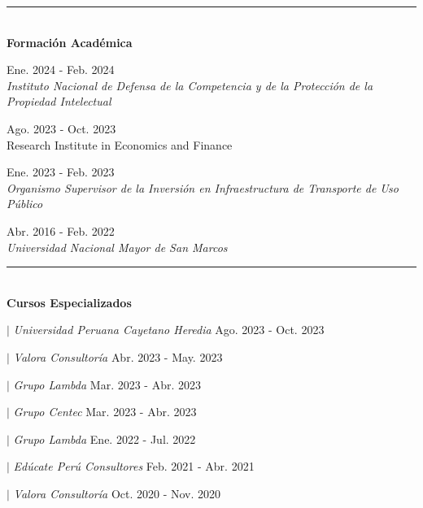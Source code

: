 \documentclass{resume}
\begin{document}
{\color{vino} \noindent \rule{\textwidth}{1pt}} \\
{\color{vino} \noindent \faGraduationCap \; {\large \bf Formación Académica}}
\vspace{3pt}

 \hfill {Ene. 2024 - Feb. 2024} \\
{\it Instituto Nacional de Defensa de la Competencia y de la Protección de la Propiedad Intelectual}
\vspace{3pt}

 \hfill {Ago. 2023 - Oct. 2023} \\
{Research Institute in Economics and Finance}
\vspace{3pt}

 \hfill {Ene. 2023 - Feb. 2023} \\
{\it Organismo Supervisor de la Inversión en Infraestructura de Transporte de Uso Público}
\vspace{3pt}

 \hfill {Abr. 2016 - Feb. 2022} \\
{\it Universidad Nacional Mayor de San Marcos}
\vspace{3pt}


{\color{vino} \noindent \rule{\textwidth}{1pt}} \\
{\color{vino} \noindent \faBook \; {\large \bf Cursos Especializados}}
\vspace{3pt}

 $|$ {\it Universidad Peruana Cayetano Heredia} \hfill {Ago. 2023 - Oct. 2023} \par
{} $|$ {\it Valora Consultoría} \hfill {Abr. 2023 - May. 2023} \par
{} $|$ {\it Grupo Lambda} \hfill {Mar. 2023 - Abr. 2023} \par
{} $|$ {\it Grupo Centec} \hfill {Mar. 2023 - Abr. 2023} \par
{} $|$ {\it Grupo Lambda} \hfill {Ene. 2022 - Jul. 2022} \par
{} $|$ {\it Edúcate Perú Consultores} \hfill {Feb. 2021 - Abr. 2021} \par
{} $|$ {\it Valora Consultoría} \hfill {Oct. 2020 - Nov. 2020} \par
\vspace{3pt}
\end{document}
